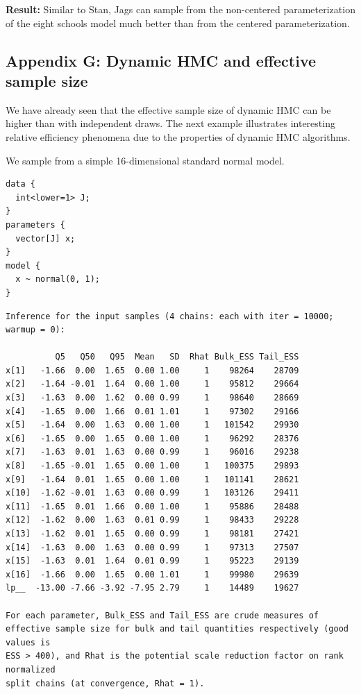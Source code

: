 \documentclass[american,]{article}
\begin{document}
\textbf{Result:} Similar to Stan, Jags can sample from the non-centered
parameterization of the eight schools model much better than from the
centered parameterization.

\hypertarget{AppendixG}{%
\subsection*{Appendix G: Dynamic HMC and effective sample
size}\label{AppendixG}}

We have already seen that the effective sample size of dynamic HMC can
be higher than with independent draws. The next example illustrates
interesting relative efficiency phenomena due to the properties of
dynamic HMC algorithms.

We sample from a simple 16-dimensional standard normal model.

\begin{verbatim}
data {
  int<lower=1> J;
}
parameters {
  vector[J] x;
}
model {
  x ~ normal(0, 1);
}
\end{verbatim}

\begin{verbatim}
Inference for the input samples (4 chains: each with iter = 10000; warmup = 0):

          Q5   Q50   Q95  Mean   SD  Rhat Bulk_ESS Tail_ESS
x[1]   -1.66  0.00  1.65  0.00 1.00     1    98264    28709
x[2]   -1.64 -0.01  1.64  0.00 1.00     1    95812    29664
x[3]   -1.63  0.00  1.62  0.00 0.99     1    98640    28669
x[4]   -1.65  0.00  1.66  0.01 1.01     1    97302    29166
x[5]   -1.64  0.00  1.63  0.00 1.00     1   101542    29930
x[6]   -1.65  0.00  1.65  0.00 1.00     1    96292    28376
x[7]   -1.63  0.01  1.63  0.00 0.99     1    96016    29238
x[8]   -1.65 -0.01  1.65  0.00 1.00     1   100375    29893
x[9]   -1.64  0.01  1.65  0.00 1.00     1   101141    28621
x[10]  -1.62 -0.01  1.63  0.00 0.99     1   103126    29411
x[11]  -1.65  0.01  1.66  0.00 1.00     1    95886    28488
x[12]  -1.62  0.00  1.63  0.01 0.99     1    98433    29228
x[13]  -1.62  0.01  1.65  0.00 0.99     1    98181    27421
x[14]  -1.63  0.00  1.63  0.00 0.99     1    97313    27507
x[15]  -1.63  0.01  1.64  0.01 0.99     1    95223    29139
x[16]  -1.66  0.00  1.65  0.00 1.01     1    99980    29639
lp__  -13.00 -7.66 -3.92 -7.95 2.79     1    14489    19627

For each parameter, Bulk_ESS and Tail_ESS are crude measures of 
effective sample size for bulk and tail quantities respectively (good values is 
ESS > 400), and Rhat is the potential scale reduction factor on rank normalized
split chains (at convergence, Rhat = 1).
\end{verbatim}
\end{document}
